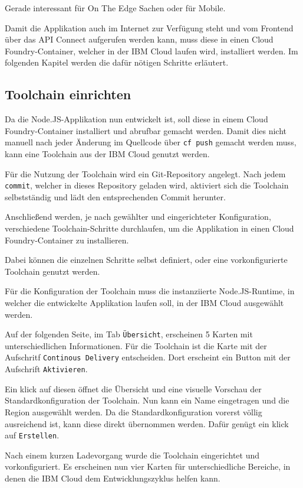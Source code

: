 Gerade interessant für On The Edge Sachen oder für Mobile.

Damit die Applikation auch im Internet zur Verfügung steht und vom Frontend über das API Connect aufgerufen werden kann,
muss diese in einen Cloud Foundry-Container, welcher in der IBM Cloud laufen wird, installiert werden. Im folgenden
Kapitel werden die dafür nötigen Schritte erläutert.

\subsection{Toolchain einrichten}
Da die Node.JS-Applikation nun entwickelt ist, soll diese in einem Cloud Foundry-Container installiert und abrufbar
gemacht werden. Damit dies nicht manuell nach jeder Änderung im Quellcode über \texttt{cf push} gemacht werden muss, kann
eine Toolchain aus der IBM Cloud genutzt werden.

Für die Nutzung der Toolchain wird ein Git-Repository angelegt. Nach jedem \texttt{commit}, welcher in dieses Repository
geladen wird, aktiviert sich die Toolchain selbstständig und lädt den entsprechenden Commit herunter.

Anschließend werden, je nach gewählter und eingerichteter Konfiguration, verschiedene Toolchain-Schritte durchlaufen, um
die Applikation in einen Cloud Foundry-Container zu installieren.

Dabei können die einzelnen Schritte selbst definiert, oder eine vorkonfigurierte Toolchain genutzt werden.

Für die Konfiguration der Toolchain muss die instanziierte Node.JS-Runtime, in welcher die entwickelte Applikation laufen
soll, in der IBM Cloud ausgewählt werden.

Auf der folgenden Seite, im Tab \texttt{Übersicht}, erscheinen 5 Karten mit unterschiedlichen Informationen. Für die
Toolchain ist die Karte mit der Aufschritf \texttt{Continous Delivery} entscheiden. Dort erscheint ein Button mit der
Aufschrift \texttt{Aktivieren}.

Ein klick auf diesen öffnet die Übersicht und eine visuelle Vorschau der Standardkonfiguration der Toolchain. Nun kann ein
Name eingetragen und die Region ausgewählt werden. Da die Standardkonfiguration vorerst völlig ausreichend ist, kann diese
direkt übernommen werden. Dafür genügt ein klick auf \texttt{Erstellen}.

Nach einem kurzen Ladevorgang wurde die Toolchain eingerichtet und vorkonfiguriert. Es erscheinen nun vier Karten für
unterschiedliche Bereiche, in denen die IBM Cloud dem Entwicklungszyklus helfen kann.

